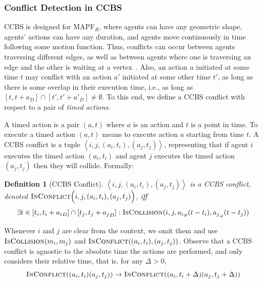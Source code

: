 \documentclass[review]{elsarticle}
\newtheorem{definition}{Definition}
\newcommand{\tuple}[1]{\ensuremath{\left \langle #1 \right \rangle }}
\newcommand{\ccbs}{\ac{CCBS}\xspace}
\newcommand{\mapfr}{\ac{MAPF}$_R$\xspace}
\newcommand{\iscollision}{\textsc{IsCollision}\xspace}
\newcommand{\inconflict}{\textsc{InConflict}\xspace}
\begin{document}
\subsubsection{Conflict Detection in \ccbs}

\ccbs is designed for \mapfr, where agents can have any geometric shape, agents' actions can have any duration, and agents move continuously in time following some motion function.
Thus, conflicts can occur between agents traversing different edges, 
as well as between agents where one is traversing an edge and the other is waiting at a vertex~\cite{li2019multi}. 
Also, an action $a$ initiated at some time $t$ may conflict with an action $a'$ initiated at some other time $t'$, as long as there is some overlap in their execution time, i.e., as long as 
$[t,t+a_D]\cap [t',t'+a'_D]\neq\emptyset$. To this end, we define a \ccbs conflict with respect to a pair of \emph{timed actions}.

A timed action is a pair $(a,t)$ where $a$ is an action and $t$ is a point in time. 
To execute a timed action $(a,t)$ means to execute action $a$ starting from time $t$. 
A \ccbs conflict is a tuple $\tuple{i,j, (a_i, t_i), (a_j, t_j)}$, representing that if agent $i$ executes the timed action $(a_i,t_i)$ and agent $j$ executes the timed action $(a_j,t_j)$ then they will collide. Formally:
\begin{definition}[\ccbs Conflict]
$\tuple{i,j, (a_i, t_i), (a_j, t_j)}$ is a \ccbs conflict, denoted 
$\inconflict \Big(i,j, (a_i,t_i), (a_j,t_j)\Big)$,
iff 
\begin{equation}
\exists t\in [t_i,t_i+{a_i}_D]\cap [t_j,t_j+{a_j}_D]: 
    \iscollision(i,j,{a_i}_\varphi(t-t_i), 
                        {a_j}_\varphi(t-t_j))
\label{eq:inconflict}
\end{equation}
\label{def:ccbs-conflict}
\end{definition}
Whenever $i$ and $j$ are clear from the context, we omit them and use $\iscollision(m_i,m_j)$ and $\inconflict((a_i,t_i), (a_j,t_j))$. 
Observe that 
a \ccbs conflict is agnostic to the absolute time the actions are performed, and only considers their relative time, that is, for any $\Delta>0$, 
\begin{equation}
    \inconflict((a_i,t_i)(a_j,t_j))\rightarrow
    \inconflict((a_i,t_i+\Delta)(a_j,t_j+\Delta))
    \label{eq:delta-invariance}
\end{equation}
\end{document}
